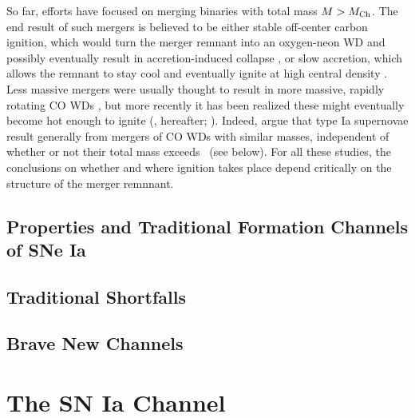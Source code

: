 So far, efforts have focused on merging binaries with total mass $M>\Mch$.  The end result of such mergers is believed to be either stable off-center carbon ignition, which would turn the merger remnant into an oxygen-neon WD and possibly eventually result in accretion-induced collapse \citep{saion98}, or slow accretion, which allows the remnant to stay cool and eventually ignite at high central density \citep{yoonpr07}.  Less massive mergers were usually thought to result in more massive, rapidly rotating CO WDs \citep{segrcm97,kube+10}, but more recently it has been realized these might eventually become hot enough to ignite (\citealt{vkercj10}, \citeal{vkercj10} hereafter; \citealt{shen+12,schw+12}).  Indeed, \citeal{vkercj10} argue that type Ia supernovae result generally from mergers of CO WDs with similar masses, independent of whether or not their total mass exceeds \Mch\ (see below).  For all these studies, the conclusions on whether and where ignition takes place depend critically on the structure of the merger remnnant.


\subsection{Properties and Traditional Formation Channels of SNe Ia}
\label{ssec:old_typeia}

\subsection{Traditional Shortfalls}

\subsection{Brave New Channels}

\section{The \citeal{vkercj10} SN Ia Channel}



